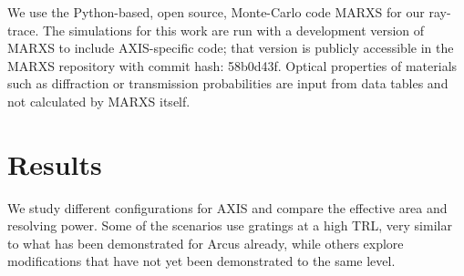 \documentclass[12pt]{spieman}  %
\begin{document}
\begin{spacing}{1}
We use the Python-based, open source, Monte-Carlo code MARXS for our ray-trace\cite{marxs1.1,2017AJ....154..243G}. The simulations for this work are run with a development version of MARXS to include AXIS-specific code; that version is publicly accessible in the MARXS repository with commit hash: 58b0d43f. Optical properties of materials such as diffraction or transmission probabilities are input from data tables and not calculated by MARXS itself.


\section{Results}
We study different configurations for AXIS and compare the effective area and resolving power. Some of the scenarios use gratings at a high TRL, very similar to what has been demonstrated for Arcus already, while others explore modifications that have not yet been demonstrated to the same level.


\end{spacing}
\end{document}
